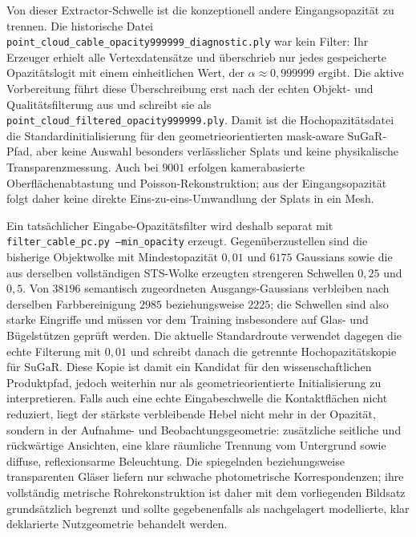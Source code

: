 \documentclass[12pt,a4paper]{article}
\begin{document}
Von dieser Extractor-Schwelle ist die konzeptionell andere Eingangsopazität zu trennen. Die historische Datei \texttt{point\_cloud\_cable\_opacity999999\_diagnostic.ply} war kein Filter: Ihr Erzeuger erhielt alle Vertexdatensätze und überschrieb nur jedes gespeicherte Opazitätslogit mit einem einheitlichen Wert, der $\alpha\approx0{,}999999$ ergibt. Die aktive Vorbereitung führt diese Überschreibung erst nach der echten Objekt- und Qualitätsfilterung aus und schreibt sie als \texttt{point\_cloud\_filtered\_opacity999999.ply}. Damit ist die Hochopazitätsdatei die Standardinitialisierung für den geometrieorientierten mask-aware SuGaR-Pfad, aber keine Auswahl besonders verlässlicher Splats und keine physikalische Transparenzmessung. Auch bei $9001$ erfolgen kamerabasierte Oberflächenabtastung und Poisson-Rekonstruktion; aus der Eingangsopazität folgt daher keine direkte Eins-zu-eins-Umwandlung der Splats in ein Mesh.

Ein tatsächlicher Eingabe-Opazitätsfilter wird deshalb separat mit \texttt{filter\_cable\_pc.py --min\_opacity} erzeugt. Gegenüberzustellen sind die bisherige Objektwolke mit Mindestopazität $0{,}01$ und $6175$ Gaussians sowie die aus derselben vollständigen STS-Wolke erzeugten strengeren Schwellen $0{,}25$ und $0{,}5$. Von $38196$ semantisch zugeordneten Ausgangs-Gaussians verbleiben nach derselben Farbbereinigung $2985$ beziehungsweise $2225$; die Schwellen sind also starke Eingriffe und müssen vor dem Training insbesondere auf Glas- und Bügelstützen geprüft werden. Die aktuelle Standardroute verwendet dagegen die echte Filterung mit $0{,}01$ und schreibt danach die getrennte Hochopazitätskopie für SuGaR. Diese Kopie ist damit ein Kandidat für den wissenschaftlichen Produktpfad, jedoch weiterhin nur als geometrieorientierte Initialisierung zu interpretieren. Falls auch eine echte Eingabeschwelle die Kontaktflächen nicht reduziert, liegt der stärkste verbleibende Hebel nicht mehr in der Opazität, sondern in der Aufnahme- und Beobachtungsgeometrie: zusätzliche seitliche und rückwärtige Ansichten, eine klare räumliche Trennung vom Untergrund sowie diffuse, reflexionsarme Beleuchtung. Die spiegelnden beziehungsweise transparenten Gläser liefern nur schwache photometrische Korrespondenzen; ihre vollständig metrische Rohrekonstruktion ist daher mit dem vorliegenden Bildsatz grundsätzlich begrenzt und sollte gegebenenfalls als nachgelagert modellierte, klar deklarierte Nutzgeometrie behandelt werden.
\end{document}
